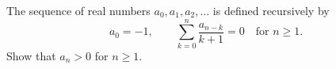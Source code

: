 The sequence of real numbers $a_0, a_1, a_2, \ldots$ is defined recursively by
\[
a_0 = -1, \qquad \sum_{k=0}^{n} \frac{a_{n-k}}{k+1} = 0 \quad \text{for } n \geq 1.
\]
Show that $a_n > 0$ for $n \geq 1$.
